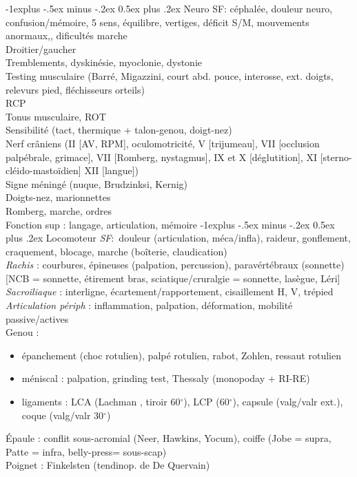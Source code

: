 \documentclass[a5paper,12pt,norsk]{article}
\makeatletter
\renewcommand{\subsection}{\@startsection{subsection}{2}{0mm}%
                                {-1explus -.5ex minus -.2ex}%
                                {0.5ex plus .2ex}%
                                {\normalfont\normalsize\bfseries}}
\makeatother
\begin{document}
\subsection{Neuro}
SF: céphalée, douleur neuro, confusion/mémoire, 5 sens, équilibre, vertiges,
déficit S/M, mouvements anormaux,, dificultés marche\\
Droitier/gaucher\\
Tremblements, dyskinésie, myoclonie, dystonie\\
Testing musculaire (Barré, Migazzini, court abd. pouce, interosse, ext. doigts,
relevurs pied, fléchisseurs orteils)\\
RCP\\
Tonus musculaire, ROT\\
Sensibilité (tact, thermique + talon-genou, doigt-nez)\\
Nerf crâniens (II [AV, RPM], oculomotricité, V [trijumeau], VII [occlusion palpébrale, grimace], VII [Romberg, nystagmus], IX et X [déglutition], XI [sterno-cléido-mastoïdien] XII [langue])\\
Signe méningé (nuque, Brudzinksi, Kernig)\\
Doigts-nez, marionnettes\\
Romberg, marche, ordres\\
Fonction sup : langage, articulation, mémoire
\subsection{Locomoteur}
\emph{SF}: douleur (articulation, méca/infla), raideur, gonflement, craquement,
blocage, marche (boîterie, claudication)\\
\emph{Rachis} : courbures, épineuses (palpation, percussion), paravértébraux
(sonnette) [NCB = sonnette, étirement bras, sciatique/cruralgie = sonnette,
lasègue, Léri]\\
\emph{Sacroiliaque} : interligne, écartement/rapportement, cisaillement H, V, trépied\\
\emph{Articulation périph} : inflammation, palpation, déformation, mobilité passive/actives\\
Genou :
\begin{itemize}
\item épanchement (choc rotulien), palpé rotulien, rabot, Zohlen, ressaut rotulien
\item méniscal : palpation, grinding test, Thessaly (monopoday + RI-RE)
\item ligaments : LCA (Lachman , tiroir 60$^{\circ}$), LCP (60$^{\circ}$),
    capsule (valg/valr ext.), coque (valg/valr 30$^{\circ}$)
\end{itemize}
Épaule : conflit sous-acromial (Neer, Hawkins, Yocum), coiffe (Jobe = supra,
Patte = infra, belly-press= sous-scap)\\
Poignet : Finkelsten (tendinop. de De Quervain)
\end{document}
